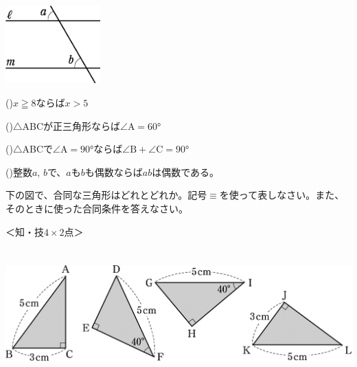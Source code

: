\documentclass[
  12pt,a4paper,lualatex,ja=standard]{bxjsarticle}
\begin{document}
\begin{flushleft}
\begin{multicols}{2}
\columnbreak

\begin{center}
\def\@captype{figure}
\includegraphics[height=30mm]{media/tu10.jpg}

\end{center}

\end{multicols}

()\hspace{2.5pt}$x \geqq 8$ならば$x > 5$

()\hspace{2.5pt}$\triangle$ABCが正三角形ならば$\angle \mbox{A} = \ang{60}$

()\hspace{2.5pt}$\triangle$ABCで$\angle \mbox{A} = \ang{90}$ならば$\angle \mbox{B} + \angle \mbox{C} = \ang{90}$

()\hspace{2.5pt}整数$a ,\, b$で、$a$も$b$も偶数ならば$ab$は偶数である。

\vfill

\noindent{} \hspace{1pt}下の図で、合同な三角形はどれとどれか。記号$\equiv$を使って表しなさい。また、そのときに使った合同条件を答えなさい。

%
\begin{flushright}%
\footnotesize{＜知・技$4 \times 2$点＞}%
\end{flushright}%


\begin{center}
\def\@captype{figure}
\includegraphics[height=50mm]{media/image160.png}


\end{center}
\end{flushleft}
\end{document}
